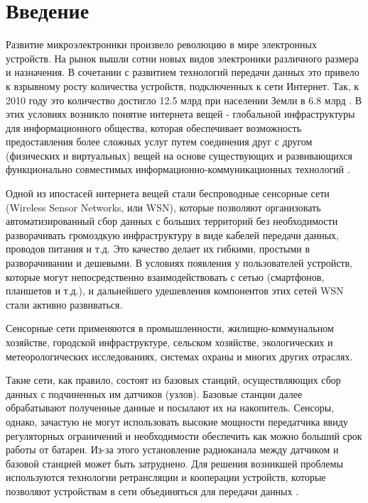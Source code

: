 \documentclass[a4paper,12pt,oneside]{scrartcl}
\begin{document}
\section{Введение}
Развитие микроэлектроники произвело революцию в мире электронных устройств. 
На рынок вышли сотни новых видов электроники различного размера и назначения. 
В сочетании с развитием технологий передачи данных это привело к взрывному росту количества устройств, подключенных к сети Интернет. 
Так, к 2010 году это количество достигло 12.5 млрд при населении Земли в 6.8 млрд \cite{A1}. 
В этих условиях возникло понятие интернета вещей - глобальной инфраструктуры для информационного общества, которая обеспечивает возможность предоставления более сложных услуг путем соединения друг с другом (физических и виртуальных) вещей на основе существующих и развивающихся функционально совместимых информационно-коммуникационных технологий \cite{A2}.


Одной из ипостасей интернета вещей стали беспроводные сенсорные сети (Wireless Sensor Networks, или WSN), которые позволяют организовать автоматизированный сбор данных с больших территорий без необходимости разворачивать громоздкую инфраструктуру в виде кабелей передачи данных, проводов питания и т.д. 
Это качество делает их гибкими, простыми в разворачивании и дешевыми. 
В условиях появления у пользователей устройств, которые могут непосредственно взаимодействовать с сетью (смартфонов, планшетов и т.д.), и дальнейшего удешевления компонентов этих сетей WSN стали активно развиваться.

Сенсорные сети применяются в промышленности, жилищно-коммунальном хозяйстве, городской инфраструктуре, сельском хозяйстве, экологических и метеорологических исследованиях, системах охраны и многих других отраслях.


Такие сети, как правило, состоят из базовых станций, осуществляющих сбор данных с подчиненных им датчиков (узлов). 
Базовые станции далее обрабатывают полученные данные и посылают их на накопитель.
Сенсоры, однако, зачастую не могут использовать высокие мощности передатчика ввиду регуляторных ограничений и необходимости обеспечить как можно больший срок работы от батареи. 
Из-за этого установление радиоканала между датчиком и базовой станцией может быть затруднено. 
Для решения возникшей проблемы используются технологии ретрансляции и кооперации устройств, которые позволяют устройствам в сети объединяться для передачи данных \cite{B1}.
\end{document}
